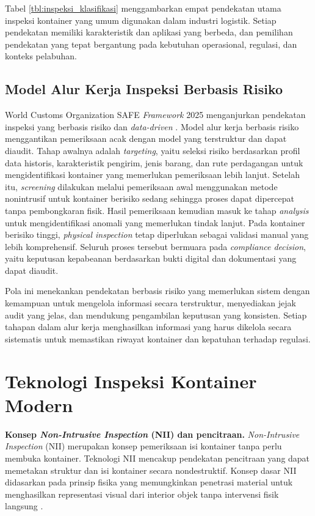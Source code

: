 \FloatBarrier

Tabel \ref{tbl:inspeksi_klasifikasi} menggambarkan empat pendekatan utama inspeksi kontainer yang umum digunakan dalam industri logistik. Setiap pendekatan memiliki karakteristik dan aplikasi yang berbeda, dan pemilihan pendekatan yang tepat bergantung pada kebutuhan operasional, regulasi, dan konteks pelabuhan.

\subsection{Model Alur Kerja Inspeksi Berbasis Risiko}

World Customs Organization SAFE \textit{Framework} 2025 menganjurkan pendekatan
inspeksi yang berbasis risiko dan \textit{data-driven} \autocite{wco2025}.
Model alur kerja berbasis risiko menggantikan pemeriksaan acak dengan model
yang terstruktur dan dapat diaudit. Tahap awalnya adalah \textit{targeting},
yaitu seleksi risiko berdasarkan profil data historis, karakteristik pengirim,
jenis barang, dan rute perdagangan untuk mengidentifikasi kontainer yang
memerlukan pemeriksaan lebih lanjut. Setelah itu, \textit{screening} dilakukan
melalui pemeriksaan awal menggunakan metode nonintrusif untuk kontainer
berisiko sedang sehingga proses dapat dipercepat tanpa pembongkaran fisik.
Hasil pemeriksaan kemudian masuk ke tahap \textit{analysis} untuk
mengidentifikasi anomali yang memerlukan tindak lanjut. Pada kontainer
berisiko tinggi, \textit{physical inspection} tetap diperlukan sebagai validasi
manual yang lebih komprehensif. Seluruh proses tersebut bermuara pada
\textit{compliance decision}, yaitu keputusan kepabeanan berdasarkan bukti
digital dan dokumentasi yang dapat diaudit.

Pola ini menekankan pendekatan berbasis risiko yang memerlukan sistem dengan
kemampuan untuk mengelola informasi secara terstruktur, menyediakan jejak audit
yang jelas, dan mendukung pengambilan keputusan yang konsisten. Setiap tahapan
dalam alur kerja menghasilkan informasi yang harus dikelola secara sistematis
untuk memastikan riwayat kontainer dan kepatuhan terhadap regulasi.

\section{Teknologi Inspeksi Kontainer Modern}

\textbf{Konsep \textit{Non-Intrusive Inspection} (NII) dan pencitraan.}
\textit{Non-Intrusive Inspection} (NII) merupakan konsep pemeriksaan isi
kontainer tanpa perlu membuka kontainer. Teknologi NII mencakup pendekatan
pencitraan yang dapat memetakan struktur dan isi kontainer secara
nondestruktif. Konsep dasar NII didasarkan pada prinsip fisika yang memungkinkan
penetrasi material untuk menghasilkan representasi visual dari interior objek
tanpa intervensi fisik langsung \autocite{wco2020}.

